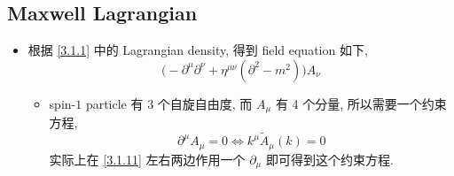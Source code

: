 \subsection{Maxwell Lagrangian} \label{subsection 3.1.2}
\begin{itemize}
	\item 根据 \eqref{3.1.1} 中的 Lagrangian density, 得到 field equation 如下,
	\begin{equation} \label{3.1.11}
		\Big( - \partial^\mu \partial^\nu + \eta^{\mu \nu} (\partial^2 - m^2) \Big) A_\nu
	\end{equation}
	\begin{itemize}
		\item spin-$1$ particle 有 3 个自旋自由度, 而 $A_\mu$ 有 4 个分量, 所以需要一个约束方程,
		\begin{equation}
			\partial^\mu A_\mu = 0 \iff k^\mu \tilde{A}_\mu(k) = 0
		\end{equation}
		实际上在 \eqref{3.1.11} 左右两边作用一个 $\partial_\mu$ 即可得到这个约束方程.
	\end{itemize}
\end{itemize}

